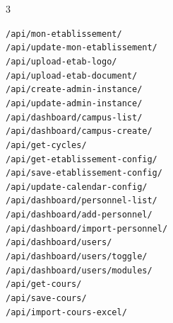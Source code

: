 \begin{multicols}{3}

{\tiny
\texttt{/api/mon-etablissement/}\\
\texttt{/api/update-mon-etablissement/}\\
\texttt{/api/upload-etab-logo/}\\
\texttt{/api/upload-etab-document/}\\
\texttt{/api/create-admin-instance/}\\
\texttt{/api/update-admin-instance/}\\
\texttt{/api/dashboard/campus-list/}\\
\texttt{/api/dashboard/campus-create/}\\
\texttt{/api/get-cycles/}\\
\texttt{/api/get-etablissement-config/}\\
\texttt{/api/save-etablissement-config/}\\
\texttt{/api/update-calendar-config/}\\
\texttt{/api/dashboard/personnel-list/}\\
\texttt{/api/dashboard/add-personnel/}\\
\texttt{/api/dashboard/import-personnel/}\\
\texttt{/api/dashboard/users/}\\
\texttt{/api/dashboard/users/toggle/}\\
\texttt{/api/dashboard/users/modules/}\\
\texttt{/api/get-cours/}\\
\texttt{/api/save-cours/}\\
\texttt{/api/import-cours-excel/}\\
}

\end{multicols}

\vfill
\begin{center}
\end{center}
